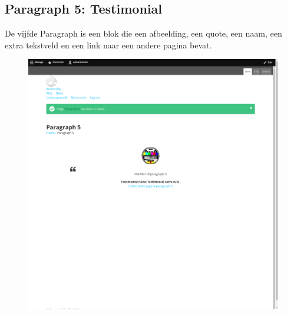 \subsection{Paragraph 5: Testimonial}
De vijfde Paragraph is een blok die een afbeelding, een quote, een  naam, een extra tekstveld en een link naar een andere pagina bevat.
\begin{figure}[h]
\includegraphics[width=1\textwidth]{img/p005.png}
\end{figure}

\clearpage
